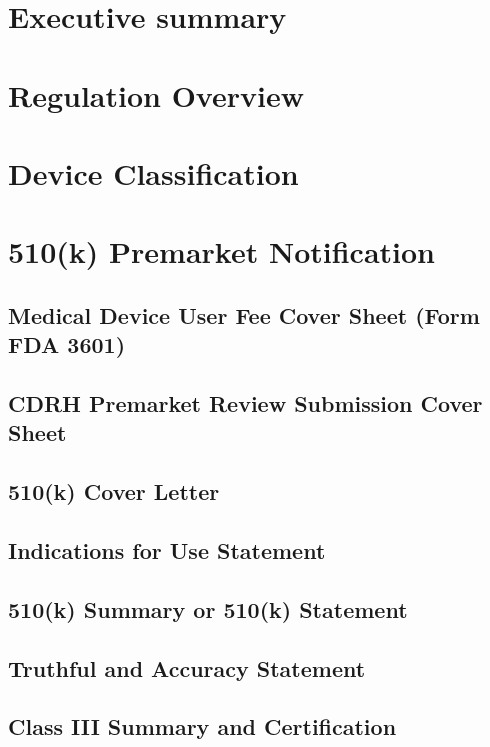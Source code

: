 \documentclass{article}
\begin{document}

\setcounter{tocdepth}{3}
\tableofcontents
\newpage

\section*{Executive summary}
\label{sec:exec-summary}

\section{Regulation Overview}
\label{sec:test-administration}

\section{Device Classification}
\label{sec:protocols}

\section{510(k) Premarket Notification}
\label{sec:protocols}
\subsection{Medical Device User Fee Cover Sheet (Form FDA 3601)}
\subsection{CDRH Premarket Review Submission Cover Sheet}
\subsection{510(k) Cover Letter}
\subsection{Indications for Use Statement}
\subsection{510(k) Summary or 510(k) Statement}
\subsection{Truthful and Accuracy Statement}
\subsection{Class III Summary and Certification}
\end{document}
